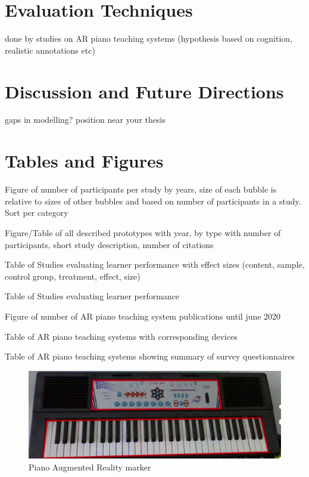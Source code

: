 \documentclass[manuscript,screen]{acmart}
\begin{document}
\section{Evaluation Techniques}
done by studies on AR piano teaching systems (hypothesis based on cognition, realistic annotations etc)

\section{Discussion and Future Directions}

gaps in modelling? position near your thesis

\section{Tables and Figures}
Figure of number of participants per study by years, size of each bubble is relative to sizes of other bubbles and based on number of participants in a study. Sort per category 

Figure/Table of all described prototypes with year, by type with number of participants, short study description, number of citations

Table of Studies evaluating learner performance with effect sizes (content, sample, control group, treatment, effect, size)

Table of Studies evaluating learner performance 

Figure of number of AR piano teaching system publications until june 2020

Table of AR piano teaching systems with corresponding devices 

Table of AR piano teaching systems showing summary of survey
questionnaires

\begin{figure}
    \centering
    \includegraphics[width=15cm]{figures/pianomarker.png}
    \caption{Piano Augmented Reality marker}
    \label{fig:pianomarker}
\end{figure}
\end{document}
